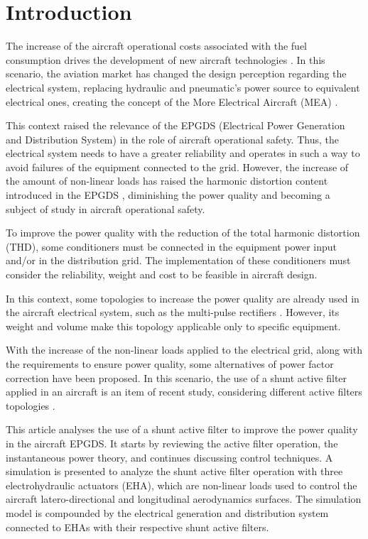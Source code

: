 \section{Introduction}

The increase of the aircraft operational costs associated with the fuel consumption drives the development of new aircraft technologies \citep{Babikian2002}. In this scenario, the aviation market has changed the design perception regarding the electrical system, replacing hydraulic and pneumatic’s power source to equivalent electrical ones, creating the concept of the More Electrical Aircraft (MEA) \citep{Moir1999}.

This context raised the relevance of the EPGDS (Electrical Power Generation and Distribution System) in the role of aircraft operational safety. Thus, the electrical system needs to have a greater reliability and operates in such a way to avoid failures of the equipment connected to the grid. However, the increase of the amount of non-linear loads has raised the harmonic distortion content introduced in the EPGDS \citep{Singer2012}, diminishing the power quality and becoming a subject of study in aircraft operational safety. 

To improve the power quality with the reduction of the total harmonic distortion (THD), some conditioners must be connected in the equipment power input and/or in the distribution grid. The implementation of these conditioners must consider the reliability, weight and cost to be feasible in aircraft design.

In this context, some topologies to increase the power quality are already used in the aircraft electrical system, such as the multi-pulse rectifiers \citep{Zhu2014,Gong2003,Lobo2005}. However, its weight and volume make this topology applicable only to specific equipment.

With the increase of the non-linear loads applied to the electrical grid, along with the requirements to ensure power quality, some alternatives of power factor correction have been proposed. In this scenario, the use of a shunt active filter applied in an aircraft is an item of recent study, considering different active filters topologies \citep{Chen2012research,Chen2012novel,Chen2012control}.

This article analyses the use of a shunt active filter to improve the power quality in the aircraft EPGDS. It starts by reviewing the active filter operation, the instantaneous power theory, and continues discussing control techniques. A simulation is presented to analyze the shunt active filter operation with three electrohydraulic actuators (EHA), which are non-linear loads used to control the aircraft latero-directional and longitudinal aerodynamics surfaces. The simulation model is compounded by the electrical generation and distribution system connected to EHAs with their respective shunt active filters.
